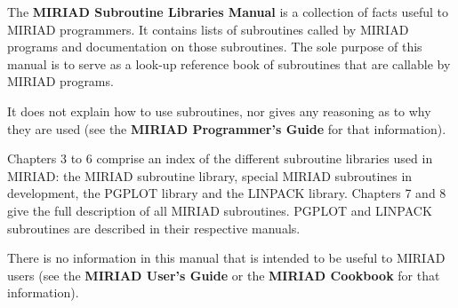 

The {\bf MIRIAD Subroutine Libraries Manual} is a collection of facts
useful to MIRIAD programmers. It contains lists of subroutines
called by MIRIAD programs and documentation on those subroutines.
The sole purpose of this manual is to serve as a look-up reference book
of subroutines that are callable by MIRIAD programs.

\vskip 0.5in
\par It does not explain how to use subroutines, nor gives any reasoning
as to why they are used (see the {\bf MIRIAD Programmer's Guide} for that
information).

\vskip 0.5in
\par Chapters 3 to 6 comprise an index of the different subroutine
libraries used in MIRIAD: the MIRIAD subroutine library,
special MIRIAD subroutines in development, the PGPLOT library and
the LINPACK library. Chapters 7 and 8 give the full description of all
MIRIAD subroutines. PGPLOT and LINPACK subroutines are described
in their respective manuals.

\vskip 0.5in
\par There is no information in this manual that is intended to be useful
to MIRIAD users (see the {\bf MIRIAD User's Guide} or the {\bf MIRIAD
Cookbook} for that information).

\endchapter

